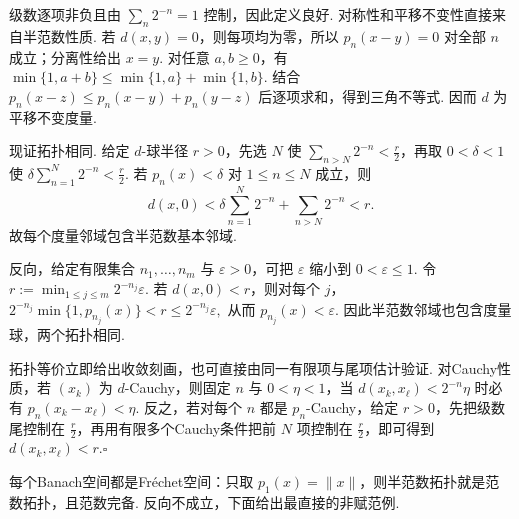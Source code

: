 \begin{FAProof}
级数逐项非负且由 \(\displaystyle \sum_n2^{-n}=1\) 控制，因此定义良好. 对称性和平移不变性直接来自半范数性质. 若 \(\displaystyle d(x,y)=0\)，则每项均为零，所以 \(\displaystyle p_n(x-y)=0\) 对全部 \(\displaystyle n\) 成立；分离性给出 \(\displaystyle x=y\). 对任意 \(\displaystyle a,b\geqslant0\)，有
\(\displaystyle \min\{1,a+b\} \leqslant \min\{1,a\}+\min\{1,b\}.\)
结合 \(\displaystyle p_n(x-z)\leqslant p_n(x-y)+p_n(y-z)\) 后逐项求和，得到三角不等式. 因而 \(\displaystyle d\) 为平移不变度量.

现证拓扑相同. 给定 \(\displaystyle d\)-球半径 \(\displaystyle r>0\)，先选 \(\displaystyle N\) 使 \(\displaystyle \sum_{n>N}2^{-n}<\frac{r}{2}\)，再取 \(\displaystyle0<\delta<1\) 使 \(\displaystyle \delta\sum_{n=1}^{N}2^{-n}<\frac{r}{2}\). 若 \(\displaystyle p_n(x)<\delta\) 对 \(\displaystyle1\leqslant n\leqslant N\) 成立，则
\[
d(x,0)
<
\delta\sum_{n=1}^{N}2^{-n}
+
\sum_{n>N}2^{-n}
<r.
\]
故每个度量邻域包含半范数基本邻域.

反向，给定有限集合 \(\displaystyle n_1,\dots,n_m\) 与 \(\displaystyle \varepsilon>0\)，可把 \(\displaystyle \varepsilon\) 缩小到 \(\displaystyle0<\varepsilon\leqslant1\). 令
\(\displaystyle r := \min_{1\leqslant j\leqslant m} 2^{-n_j}\varepsilon.\)
若 \(\displaystyle d(x,0)<r\)，则对每个 \(\displaystyle j\)，
\(\displaystyle 2^{-n_j}\min\{1,p_{n_j}(x)\}<r\leqslant2^{-n_j}\varepsilon,\)
从而 \(\displaystyle p_{n_j}(x)<\varepsilon\). 因此半范数邻域也包含度量球，两个拓扑相同.

拓扑等价立即给出收敛刻画，也可直接由同一有限项与尾项估计验证. 对Cauchy性质，若 \(\displaystyle (x_k)\) 为 \(\displaystyle d\)-Cauchy，则固定 \(\displaystyle n\) 与 \(\displaystyle0<\eta<1\)，当 \(\displaystyle d(x_k,x_\ell)<2^{-n}\eta\) 时必有 \(\displaystyle p_n(x_k-x_\ell)<\eta\). 反之，若对每个 \(\displaystyle n\) 都是 \(\displaystyle p_n\)-Cauchy，给定 \(\displaystyle r>0\)，先把级数尾控制在 \(\displaystyle \frac{r}{2}\)，再用有限多个Cauchy条件把前 \(\displaystyle N\) 项控制在 \(\displaystyle \frac{r}{2}\)，即可得到 \(\displaystyle d(x_k,x_\ell)<r\).\hfill\(\square\)
\end{FAProof}

每个Banach空间都是Fr\'echet空间：只取 \(\displaystyle p_1(x)=\|x\|\)，则半范数拓扑就是范数拓扑，且范数完备. 反向不成立，下面给出最直接的非赋范例.

